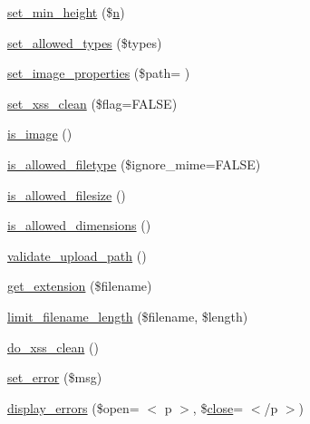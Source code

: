 \begin{DoxyCompactItemize}
\item 
\hyperlink{class_c_i___upload_a72c6007605b27c92dfd83c6e21fe82e3}{set\+\_\+min\+\_\+height} (\$\hyperlink{cli_2error__general_8php_ace0fd03cd383f20ce6ea63247a207294}{n})
\item 
\hyperlink{class_c_i___upload_a7c7ddfefedddc3fd625dd816d67c21bf}{set\+\_\+allowed\+\_\+types} (\$types)
\item 
\hyperlink{class_c_i___upload_a5a85ab4c11b130ebc33ba1f07baac1fe}{set\+\_\+image\+\_\+properties} (\$path= \textquotesingle{}\textquotesingle{})
\item 
\hyperlink{class_c_i___upload_a5556024223414507d84d221862919212}{set\+\_\+xss\+\_\+clean} (\$flag=F\+A\+L\+S\+E)
\item 
\hyperlink{class_c_i___upload_af6f513bc693e3ba836f23fe9bebc6427}{is\+\_\+image} ()
\item 
\hyperlink{class_c_i___upload_a248e8cef69fc954953dc988e8d82afca}{is\+\_\+allowed\+\_\+filetype} (\$ignore\+\_\+mime=F\+A\+L\+S\+E)
\item 
\hyperlink{class_c_i___upload_aa1283241c3b2fc700c7b577beecd5f97}{is\+\_\+allowed\+\_\+filesize} ()
\item 
\hyperlink{class_c_i___upload_a70d66ccc85ab4ec9e76e02cfeaccc193}{is\+\_\+allowed\+\_\+dimensions} ()
\item 
\hyperlink{class_c_i___upload_a067f092935018f0d1fbfa955ddecfee3}{validate\+\_\+upload\+\_\+path} ()
\item 
\hyperlink{class_c_i___upload_a6c656eedccb1131accc8e350bc50632f}{get\+\_\+extension} (\$filename)
\item 
\hyperlink{class_c_i___upload_ab1f627192a69c4b88a44ad60ba05d0af}{limit\+\_\+filename\+\_\+length} (\$filename, \$length)
\item 
\hyperlink{class_c_i___upload_ae7e5f9b6d774795da126647f10c3c2a6}{do\+\_\+xss\+\_\+clean} ()
\item 
\hyperlink{class_c_i___upload_a892f1ba7cba3731a3fc68f1f64e92610}{set\+\_\+error} (\$msg)
\item 
\hyperlink{class_c_i___upload_a3ed4aa1a4d480c82bb1b663efd466aee}{display\+\_\+errors} (\$open= \textquotesingle{}$<$ p $>$\textquotesingle{}, \$\hyperlink{assets_2js_2bootstrap_8min_8js_afaca3a961d693f40135a872e93e71198}{close}= \textquotesingle{}$<$/p $>$\textquotesingle{})
\end{DoxyCompactItemize}
